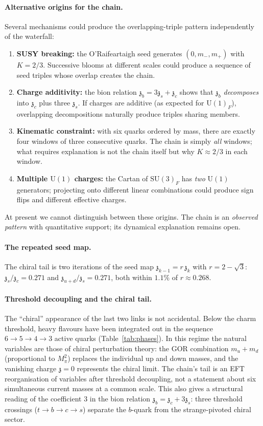 \documentclass[aps,prd,twocolumn,showpacs,preprintnumbers,superscriptaddress,floatfix]{revtex4-2}
\newcommand{\SU}{\mathrm{SU}}
\newcommand{\UU}{\mathrm{U}}
\newcommand{\zch}{\mathfrak{z}}
\begin{document}
\paragraph{Alternative origins for the chain.}
Several mechanisms could produce the overlapping-triple pattern
independently of the waterfall:
\begin{enumerate}
  \item \textbf{SUSY breaking:} the O'Raifeartaigh seed
    generates $(0, m_-, m_+)$ with $K = 2/3$.
    Successive blooms at different scales could produce a
    sequence of seed triples whose overlap creates the chain.
  \item \textbf{Charge additivity:} the bion relation
    $\zch_b = 3\zch_s + \zch_c$ shows that $\zch_b$
    \emph{decomposes} into $\zch_c$ plus three $\zch_s$.
    If charges are additive (as expected for $\UU(1)_F$),
    overlapping decompositions naturally produce triples
    sharing members.
  \item \textbf{Kinematic constraint:} with six quarks ordered
    by mass, there are exactly four windows of three consecutive
    quarks.  The chain is simply \emph{all} windows; what
    requires explanation is not the chain itself but why
    $K \approx 2/3$ in each window.
  \item \textbf{Multiple $\UU(1)$ charges:} the Cartan of
    $\SU(3)_F$ has \emph{two} $\UU(1)$ generators; projecting
    onto different linear combinations could produce sign flips
    and different effective charges.
\end{enumerate}
At present we cannot distinguish between these origins.
The chain is an \emph{observed pattern} with quantitative support;
its dynamical explanation remains open.

\paragraph{The repeated seed map.}
The chiral tail is two iterations of the seed map
$\zch_{k-1} = r\,\zch_k$ with $r = 2 - \sqrt{3}$:
$\zch_s/\zch_c = 0.271$ and $\zch_{u+d}/\zch_s = 0.271$,
both within $1.1\%$ of $r \approx 0.268$.

\paragraph{Threshold decoupling and the chiral tail.}
The ``chiral'' appearance of the last two links is not accidental.
Below the charm threshold, heavy flavours have been integrated out
in the sequence $6 \to 5 \to 4 \to 3$ active quarks
(Table~\ref{tab:phases}).
In this regime the natural variables are those of chiral
perturbation theory: the GOR combination
$m_u + m_d$ (proportional to $M_\pi^2$) replaces the individual
up and down masses, and the vanishing charge $\zch = 0$ represents
the chiral limit.
The chain's tail is an EFT reorganisation of variables after
threshold decoupling, not a statement about six simultaneous
current masses at a common scale.
This also gives a structural reading of the coefficient 3 in the
bion relation $\zch_b = \zch_c + 3\zch_s$: three threshold
crossings ($t \to b \to c \to s$) separate the $b$-quark from
the strange-pivoted chiral sector.
\end{document}
